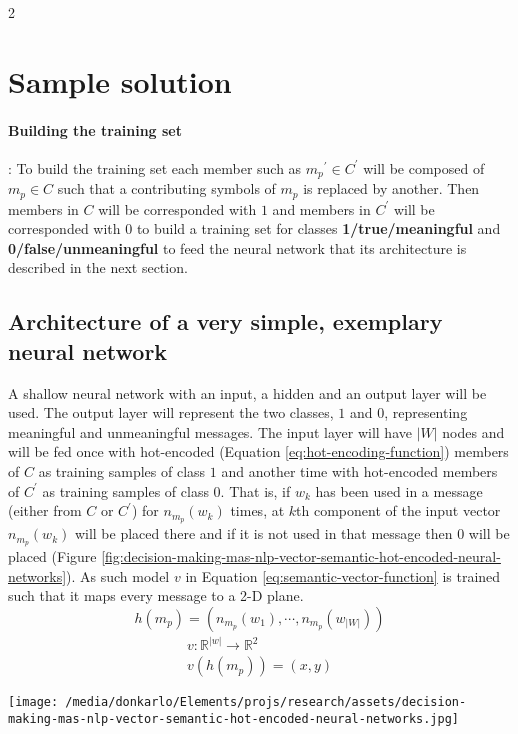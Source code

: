 \documentclass{article}
\begin{document}
\begin{multicols}{2}
	\section{Sample solution}\label{sec:sample-solution}
		\paragraph{Building the training set}: To build the training set each member such as ${m_p}^{'} \in C^{'}$ will be composed of $m_p \in C$ such that a contributing symbols of ${m_p}$ is replaced by another. Then members in $C$ will be corresponded with $1$ and members in $C^{'}$ will be corresponded with $0$ to build a training set for classes \textbf{1/true/meaningful} and \textbf{0/false/unmeaningful} to feed the neural network that its architecture is described in the next section.
		\subsection{Architecture of a very simple, exemplary neural network} 
			A shallow neural network with an input, a hidden and an output layer will be used. The output layer will represent the two classes, $1$ and $0$, representing meaningful and unmeaningful messages. The input layer will have $|W|$ nodes and will be fed once with hot-encoded (Equation \ref{eq:hot-encoding-function}) members of $C$ as training samples of class $1$ and another time with hot-encoded members of $C^{'}$ as training samples of class $0$. That is, if $w_k$ has been used in a message (either from $C$ or $C^{'}$) for $n_{m_p}(w_k)$ times, at $k$th component of the input vector $n_{m_p}(w_k)$ will be placed there and if it is not used in that message then $0$ will be placed (Figure \ref{fig:decision-making-mas-nlp-vector-semantic-hot-encoded-neural-networks}). As such model $v$ in Equation \ref{eq:semantic-vector-function} is trained such that it maps every message to a 2-D plane.
			\begin{equation}
				h(m_p) = (n_{m_p}(w_1),\dotsb,n_{m_p}(w_{|W|}))
				\label{eq:hot-encoding-function}
			\end{equation}
			\begin{multline}
				v: \mathbb{R}^{|w|} \rightarrow \mathbb{R}^2
				\\
				v(h(m_p))=(x,y)
				\label{eq:semantic-vector-function}
			\end{multline}
			\begin{figure*}
				\centering
				\texttt{[image: /media/donkarlo/Elements/projs/research/assets/decision-making-mas-nlp-vector-semantic-hot-encoded-neural-networks.jpg]}
				\caption{The architecture of a shallow neural network to map messages in $C$ and $C^{'}$ to a 2-D plane}
				\label{fig:decision-making-mas-nlp-vector-semantic-hot-encoded-neural-networks}
			\end{figure*}
			

\end{multicols}
\end{document}
